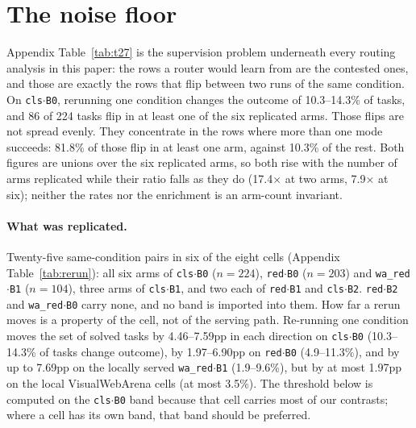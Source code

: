 \section{The noise floor}\label{sec:noise}

Appendix Table~\ref{tab:t27} is the supervision problem underneath every routing analysis in this paper: the rows a router would learn from are the contested ones, and those are exactly the rows that flip between two runs of the same condition. On \texttt{cls$\cdot$B0}, rerunning one condition changes the outcome of 10.3--14.3\% of tasks, and 86 of 224 tasks flip in at least one of the six replicated arms. Those flips are not spread evenly. They concentrate in the rows where more than one mode succeeds: 81.8\% of those flip in at least one arm, against 10.3\% of the rest. Both figures are unions over the six replicated arms, so both rise with the number of arms replicated while their ratio falls as they do (17.4$\times$ at two arms, 7.9$\times$ at six); neither the rates nor the enrichment is an arm-count invariant.

\paragraph{What was replicated.} Twenty-five same-condition pairs in six of the eight cells (Appendix Table~\ref{tab:rerun}): all six arms of \texttt{cls$\cdot$B0} ($n=224$), \texttt{red$\cdot$B0} ($n=203$) and \texttt{wa\_red$\cdot$B1} ($n=104$), three arms of \texttt{cls$\cdot$B1}, and two each of \texttt{red$\cdot$B1} and \texttt{cls$\cdot$B2}. \texttt{red$\cdot$B2} and \texttt{wa\_red$\cdot$B0} carry none, and no band is imported into them. How far a rerun moves is a property of the cell, not of the serving path. Re-running one condition moves the set of solved tasks by 4.46--7.59pp in each direction on \texttt{cls$\cdot$B0} (10.3--14.3\% of tasks change outcome), by 1.97--6.90pp on \texttt{red$\cdot$B0} (4.9--11.3\%), and by up to 7.69pp on the locally served \texttt{wa\_red$\cdot$B1} (1.9--9.6\%), but by at most 1.97pp on the local VisualWebArena cells (at most 3.5\%). The threshold below is computed on the \texttt{cls$\cdot$B0} band because that cell carries most of our contrasts; where a cell has its own band, that band should be preferred.

